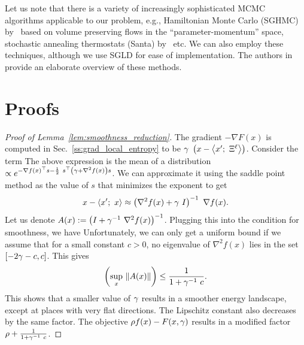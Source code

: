 \documentclass[10pt]{article}
\newcommand{\minibatch}[1]{\Xi^{#1}}
\begin{document}
\begin{appendices}
Let us note that there is a variety of increasingly sophisticated MCMC algorithms applicable to our problem, e.g., Hamiltonian Monte Carlo (SGHMC) by~\citet{chen2014stochastic} based on volume preserving flows in the ``parameter-momentum'' space, stochastic annealing thermostats (Santa) by~\citet{chen2015bridging} etc. We can also employ these techniques, although we use SGLD for ease of implementation. The authors in~\citet{ma2015complete} provide an elaborate overview of these methods.

\section{Proofs}
\label{s:app:proofs}

\begin{proof}[Proof of Lemma~\ref{lem:smoothness_reduction}]
The gradient $-\nabla F(x)$ is computed in Sec.~\ref{ss:grad_local_entropy} to be $\g\ \rbrac{x - \ag{x';\ \minibatch{\ell}}}$. Consider the term
The above expression is the mean of a distribution $\propto e^{-\nabla f(x)^\top s - \f{1}{2}\ s^\top \rbrac{\g + \nabla^2 f(x)} s}$. We can approximate it using the saddle point method as the value of $s$ that minimizes the exponent to get
$$
    x - \left\langle x';\ x\right\rangle \approx \left(\nabla^2 f(x) + \gamma\ I\right)^{-1}\ \nabla f(x).
$$
Let us denote $A(x) := \left(I + \gamma^{-1}\ \nabla^2 f(x)\right)^{-1}$. Plugging this into the condition for smoothness, we have
Unfortunately, we can only get a uniform bound if we assume that for a small constant $c > 0$, no eigenvalue of $\nabla^2 f(x)$ lies in the set $[-2 \gamma -c, c]$. This gives
$$
    \left(\sup_x\ \lVert A(x)\rVert\right) \leq \frac{1}{1+\gamma^{-1}\ c}.
$$
This shows that a smaller value of $\gamma$ results in a smoother energy landscape, except at places with very flat directions. The Lipschitz constant also decreases by the same factor. The objective $\rho f(x) - F(x,\gamma)$ results in a modified factor $\r + \f{1}{1+\g^{-1}\ c}$.
\end{proof}


\end{appendices}
\end{document}
